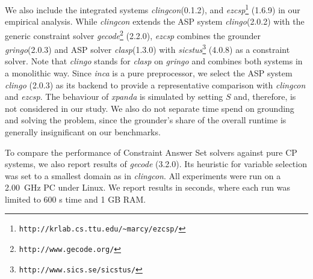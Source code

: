 \documentclass{tlp}
\newcommand{\systemname}[1]{\emph{#1}}
\newcommand{\encsup}{$S$}
\begin{document}
We also include the integrated systems \systemname{clingcon}\footnotemark[1] (0.1.2), and \systemname{ezcsp}\footnote[2]{\texttt{http://krlab.cs.ttu.edu/\~{}marcy/ezcsp/}} (1.6.9) in our empirical analysis.
While \systemname{clingcon} extends the ASP system \systemname{clingo}\footnotemark[1] (2.0.2) with the generic constraint solver \systemname{gecode}\footnote[3]{\texttt{http://www.gecode.org/}} (2.2.0), \systemname{ezcsp} combines the grounder \systemname{gringo}\footnotemark[1] (2.0.3) and ASP solver \systemname{clasp}\footnotemark[1] (1.3.0) with \systemname{sicstus}\footnote[4]{\texttt{http://www.sics.se/sicstus/}} (4.0.8) as a constraint solver.
Note that \systemname{clingo} stands for \systemname{clasp} on \systemname{gringo} and combines both systems in a monolithic way. Since \systemname{inca} is a pure preprocessor, we select the ASP system \systemname{clingo} (2.0.3) as its backend to provide a representative comparison with \systemname{clingcon} and \systemname{ezcsp}.
The behaviour of \systemname{xpanda} is simulated by setting \encsup{} and, therefore, is not considered in our study. We also do not separate time spend on grounding and solving the problem, since the grounder's share of the overall runtime is generally insignificant on our benchmarks.

To compare the performance of Constraint Answer Set solvers against pure CP systems, we also report results of \systemname{gecode} (3.2.0). Its heuristic for variable selection was set to a smallest domain as in \systemname{clingcon}.
All experiments were run on a 2.00~GHz PC under Linux. We report results in seconds, where each run was limited to 600 s time and 1 GB RAM.
\end{document}
